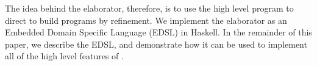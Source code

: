 The idea behind the \Idris{} elaborator, therefore, is to use the high level program
to direct  to build \TT{} programs by refinement. We implement the
elaborator as an Embedded Domain Specific Language (EDSL) in Haskell. 
In the remainder
of this paper, we describe the EDSL, and demonstrate how it can be used to implement
all of the high level features of \Idris{}.



